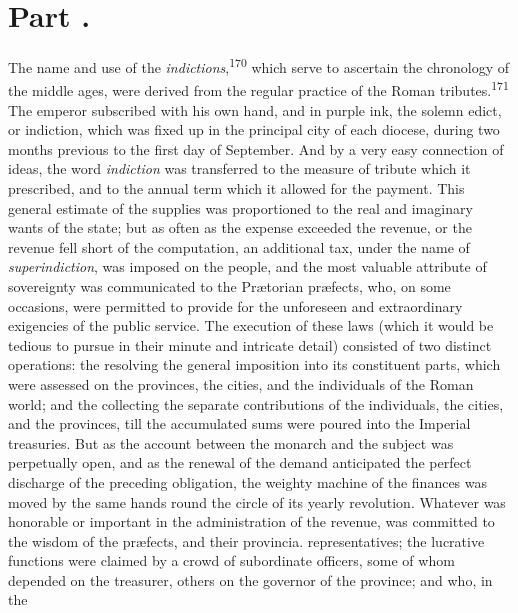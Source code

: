 

\section{Part \thesection.}

The name and use of the \textit{indictions},\textsuperscript{170} which serve to
ascertain the chronology of the middle ages, were derived from
the regular practice of the Roman tributes.\textsuperscript{171} The emperor
subscribed with his own hand, and in purple ink, the solemn
edict, or indiction, which was fixed up in the principal city of
each diocese, during two months previous to the first day of
September. And by a very easy connection of ideas, the word
\textit{indiction} was transferred to the measure of tribute which it
prescribed, and to the annual term which it allowed for the
payment. This general estimate of the supplies was proportioned
to the real and imaginary wants of the state; but as often as the
expense exceeded the revenue, or the revenue fell short of the
computation, an additional tax, under the name of
\textit{superindiction}, was imposed on the people, and the most
valuable attribute of sovereignty was communicated to the
Prætorian præfects, who, on some occasions, were permitted to
provide for the unforeseen and extraordinary exigencies of the
public service. The execution of these laws (which it would be
tedious to pursue in their minute and intricate detail) consisted
of two distinct operations: the resolving the general imposition
into its constituent parts, which were assessed on the provinces,
the cities, and the individuals of the Roman world; and the
collecting the separate contributions of the individuals, the
cities, and the provinces, till the accumulated sums were poured
into the Imperial treasuries. But as the account between the
monarch and the subject was perpetually open, and as the renewal
of the demand anticipated the perfect discharge of the preceding
obligation, the weighty machine of the finances was moved by the
same hands round the circle of its yearly revolution. Whatever
was honorable or important in the administration of the revenue,
was committed to the wisdom of the præfects, and their provincia.
representatives; the lucrative functions were claimed by a crowd
of subordinate officers, some of whom depended on the treasurer,
others on the governor of the province; and who, in the
